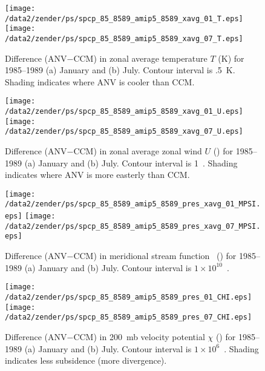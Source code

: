 \documentclass[twocolumn,final]{article}
\begin{document}
\begin{figure}
\begin{center}
\texttt{[image: /data2/zender/ps/spcp\_85\_8589\_amip5\_8589\_xavg\_01\_T.eps]}\vfill
\texttt{[image: /data2/zender/ps/spcp\_85\_8589\_amip5\_8589\_xavg\_07\_T.eps]}\vfill
\end{center}
\caption[Difference (ANV$-$CCM) in zonal average temperature $T$
for 1985--1989 January and July]{
Difference (ANV$-$CCM) in zonal average temperature $T$
(\degreee K) for 1985--1989 (a) January and (b) July.
Contour interval is .5~\degreee K. 
Shading indicates where ANV is cooler than CCM.
\label{fig:8589_T}}   
\end{figure}

\begin{figure}
\begin{center}
\texttt{[image: /data2/zender/ps/spcp\_85\_8589\_amip5\_8589\_xavg\_01\_U.eps]}\vfill
\texttt{[image: /data2/zender/ps/spcp\_85\_8589\_amip5\_8589\_xavg\_07\_U.eps]}\vfill
\end{center}
\caption[Difference (ANV$-$CCM) in zonal average zonal wind $U$
for 1985--1989 January and July]{
Difference (ANV$-$CCM) in zonal average zonal wind $U$ (\mxs) for
1985--1989 (a) January and (b) July.
Contour interval is 1~\mxs. 
Shading indicates where ANV is more easterly than CCM.
\label{fig:8589_U}}   
\end{figure}

\begin{figure}
\begin{center}
\texttt{[image: /data2/zender/ps/spcp\_85\_8589\_amip5\_8589\_pres\_xavg\_01\_MPSI.eps]}\vfill
\texttt{[image: /data2/zender/ps/spcp\_85\_8589\_amip5\_8589\_pres\_xavg\_07\_MPSI.eps]}\vfill
\end{center}
\caption[Difference (ANV$-$CCM) in meridional stream function \mpsi\ 
for 1985--1989 January and July]{
Difference (ANV$-$CCM) in meridional stream function \mpsi\
(\kgxs) for 1985--1989 (a) January and (b) July.
Contour interval is $1 \times 10^{10}$~\kgxs.  
\label{fig:pres_xavg_8589_MPSI}}
\end{figure}

\begin{figure}
\begin{center}
\texttt{[image: /data2/zender/ps/spcp\_85\_8589\_amip5\_8589\_pres\_01\_CHI.eps]}\vfill
\texttt{[image: /data2/zender/ps/spcp\_85\_8589\_amip5\_8589\_pres\_07\_CHI.eps]}\vfill
\end{center}
\caption[Difference (ANV$-$CCM) in 200~mb velocity potential $\chi$
for 1985--1989 January and July]{
Difference (ANV$-$CCM) in 200~mb velocity potential $\chi$ (\mSxs)
for 1985--1989 (a) January and (b) July.
Contour interval is $1 \times 10^6$~\mSxs. 
Shading indicates less subsidence (more divergence).
\label{fig:pres_8589_CHI}}
\end{figure}
\clearpage
\end{document}
